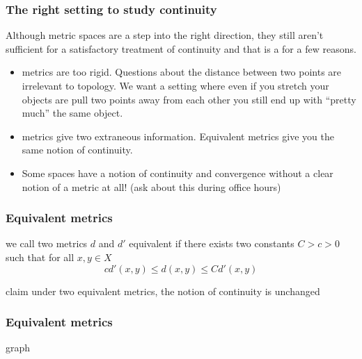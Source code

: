 \documentclass{beamer}
\begin{document}
\begin{frame}
    \frametitle{The right setting to study continuity}

    Although metric spaces are a step into the right direction, they still aren't sufficient for a satisfactory treatment of continuity
    \pause and that is a for a few reasons.
    \begin{itemize}
        \item metrics are too rigid. Questions about the distance between two points are irrelevant to topology. \pause We want a setting
        where even if you stretch your objects are pull two points away from each other you still end up with ``pretty much'' the same
        object.\pause
        \item metrics give two extraneous information. Equivalent metrics give you the same notion of continuity.\pause
        \item Some spaces have a notion of continuity and convergence without a clear notion of a metric at all! (ask about this during
        office hours)
    \end{itemize}

\end{frame}

\begin{frame}
    \frametitle{Equivalent metrics}

    \begin{definition}
        we call two metrics $d$ and $d'$ equivalent if there exists two constants $C>c>0$ such that for all $x, y\in X$
        \[cd'(x, y)\leq d(x, y)\leq Cd'(x, y)\]
    \end{definition}\pause
    \begin{block}{claim}
        under two equivalent metrics, the notion of continuity is unchanged
    \end{block}
\end{frame}

\begin{frame}
    \frametitle{Equivalent metrics}

    \begin{block}{graph}
        \vspace{5cm}
    \end{block}

\end{frame}
\end{document}
